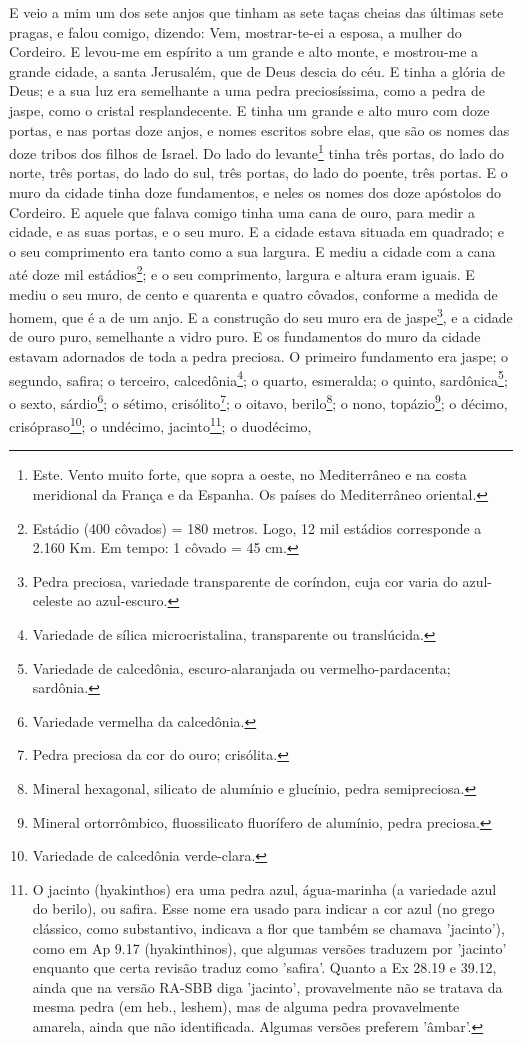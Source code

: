 E veio a mim um dos sete anjos que tinham as sete taças cheias das
últimas sete pragas, e falou comigo, dizendo: Vem, mostrar-te-ei a
esposa, a mulher do Cordeiro. E levou-me em espírito a um
grande e alto monte, e mostrou-me a grande cidade, a santa
Jerusalém, que de Deus descia do céu. E tinha a glória de
Deus; e a sua luz era semelhante a uma pedra preciosíssima, como a
pedra de jaspe, como o cristal resplandecente. E tinha um
grande e alto muro com doze portas, e nas portas doze anjos, e nomes
escritos sobre elas, que são os nomes das doze tribos dos filhos de
Israel. Do lado do levante\footnote{Este. Vento muito forte,
que sopra a oeste, no Mediterrâneo e na costa meridional da França e
da Espanha. Os países do Mediterrâneo oriental.} tinha três portas,
do lado do norte, três portas, do lado do sul, três portas, do lado
do poente, três portas. E o muro da cidade tinha doze
fundamentos, e neles os nomes dos doze apóstolos do Cordeiro.
E aquele que falava comigo tinha uma cana de ouro, para medir
a cidade, e as suas portas, e o seu muro. E a cidade estava
situada em quadrado; e o seu comprimento era tanto como a sua
largura. E mediu a cidade com a cana até doze mil
estádios\footnote{Estádio (400 côvados) = 180 metros. Logo, 12 mil
estádios corresponde a 2.160 Km. Em tempo: 1 côvado = 45 cm.}; e o
seu comprimento, largura e altura eram iguais. E mediu o seu
muro, de cento e quarenta e quatro côvados, conforme a medida de
homem, que é a de um anjo. E a construção do seu muro era de
jaspe\footnote{ Pedra preciosa, variedade transparente de coríndon,
cuja cor varia do azul-celeste ao azul-escuro.}, e a cidade de ouro
puro, semelhante a vidro puro. E os fundamentos do muro da
cidade estavam adornados de toda a pedra preciosa. O primeiro
fundamento era jaspe; o segundo, safira; o terceiro,
calcedônia\footnote{Variedade de sílica microcristalina,
transparente ou translúcida.}; o quarto, esmeralda; o quinto,
sardônica\footnote{Variedade de calcedônia, escuro-alaranjada ou
vermelho-pardacenta; sardônia.}; o sexto, sárdio\footnote{Variedade
vermelha da calcedônia.}; o sétimo, crisólito\footnote{Pedra
preciosa da cor do ouro; crisólita.}; o oitavo,
berilo\footnote{Mineral hexagonal, silicato de alumínio e glucínio,
pedra semipreciosa.}; o nono, topázio\footnote{Mineral ortorrômbico,
fluossilicato fluorífero de alumínio, pedra preciosa.}; o décimo,
crisópraso\footnote{Variedade de calcedônia verde-clara.}; o
undécimo, jacinto\footnote{O jacinto (hyakinthos) era uma pedra
azul, água-marinha (a variedade azul do berilo), ou safira. Esse
nome era usado para indicar a cor azul (no grego clássico, como
substantivo, indicava a flor que também se chamava 'jacinto'), como
em Ap 9.17 (hyakinthinos), que algumas versões traduzem por
'jacinto' enquanto que certa revisão traduz como 'safira'. Quanto a
Ex 28.19 e 39.12, ainda que na versão RA-SBB diga 'jacinto',
provavelmente não se tratava da mesma pedra (em heb., leshem), mas
de alguma pedra provavelmente amarela, ainda que não identificada.
Algumas versões preferem 'âmbar'.}; o duodécimo,
